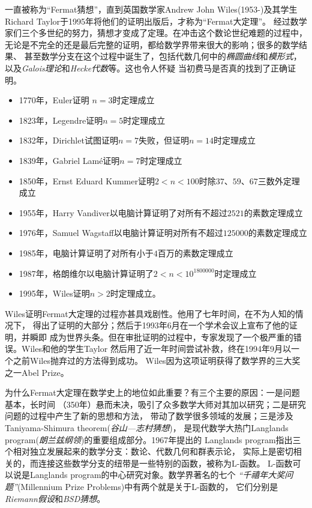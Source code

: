 \begin{shaded}
	一直被称为“Fermat猜想”，直到英国数学家Andrew John Wiles(1953-)及其学生Richard
	Taylor于1995年将他们的证明出版后，才称为“Fermat大定理”。
	经过数学家们三个多世纪的努力，猜想才变成了定理。在冲击这个数论世纪难题的过程中，
	无论是不完全的还是最后完整的证明，都给数学界带来很大的影响；很多的数学结果、
	甚至数学分支在这个过程中诞生了，包括代数几何中的{\it 椭圆曲线}和{\it 模形式}，
	以及{\it	Galois理论}和{\it Hecke代数}等。这也令人怀疑
	当初费马是否真的找到了正确证明。
	
	\begin{itemize}
	  \setlength{\itemindent}{1cm}
	  \item 1770年，Euler证明 $n=3$时定理成立
	  \item 1823年，Legendre证明$n=5$时定理成立
      \item 1832年，Dirichlet试图证明$n=7$失败，但证明$n=14$时定理成立
	  \item 1839年，Gabriel Lamé证明$n=7$时定理成立
	  \item 1850年，Ernst Eduard Kummer证明$2<n<100$时除$37$、$59$、$67$三数外定理成立
	  \item 1955年，Harry Vandiver以电脑计算证明了对所有不超过$2521$的素数定理成立
	  \item 1976年，Samuel Wagstaff以电脑计算证明对所有不超过$125000$的素数定理成立
	  \item 1985年，电脑计算证明了对所有小于$4$百万的素数定理成立
	  \item 1987年，格朗维尔以电脑计算证明了$2<n<10^{{1800000}}$时定理成立
	  \item 1995年，Wiles证明$n>2$时定理成立。
	\end{itemize}
	
	Wiles证明Fermat大定理的过程亦甚具戏剧性。他用了七年时间，在不为人知的情况下，
	得出了证明的大部分；然后于1993年6月在一个学术会议上宣布了他的证明，并瞬即
	成为世界头条。但在审批证明的过程中，专家发现了一个极严重的错误。Wiles和他的学生Taylor
	然后用了近一年时间尝试补救，终在1994年9月以一个之前Wiles抛弃过的方法得到成功。
	Wiles因为这项证明获得了数学界的三大奖之一Abel Prize。
	
	为什么Fermat大定理在数学史上的地位如此重要？有三个主要的原因：一是问题基本，长时间
	（350年）悬而未决，吸引了众多数学大师对其加以研究；二是研究问题的过程中产生了新的思想和方法，
	带动了数学很多领域的发展；三是涉及Taniyama-Shimura theorem({\it 谷山—志村猜想})，
	是现代数学大热门Langlands program({\it 朗兰兹纲领})的重要组成部分。1967年提出的
	Langlands program指出三个相对独立发展起来的数学分支：数论、代数几何和群表示论，
	实际上是密切相关的，而连接这些数学分支的纽带是一些特别的函数，被称为L-函数。
	L-函数可以说是Langlands program的中心研究对象。数学界著名的七个
	{\it “千禧年大奖问题”}(Millennium Prize Problems)中有两个就是关于L-函数的，
	它们分别是{\it Riemann假设}和{\it BSD猜想}。
	

\end{shaded}
